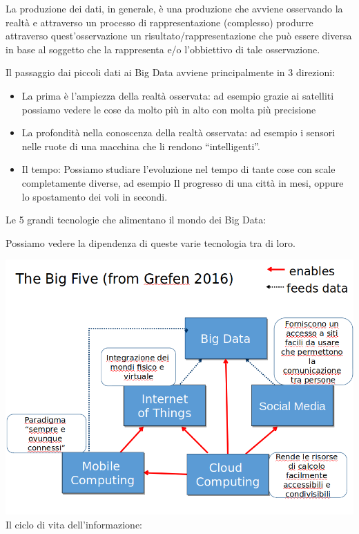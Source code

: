 \documentclass[a4page, 11pt]{article}
\begin{document}
La produzione dei dati, in generale, è una produzione che avviene
osservando la realtà e attraverso un processo di rappresentazione
(complesso) produrre attraverso quest'osservazione un
risultato/rappresentazione che può essere diversa in base al soggetto
che la rappresenta e/o l'obbiettivo di tale osservazione.

Il passaggio dai piccoli dati ai Big Data avviene principalmente in 3
direzioni:

\begin{itemize}
	 
	\item
	La prima è l'ampiezza della realtà osservata: ad esempio grazie ai
	satelliti possiamo vedere le cose da molto più in alto con molta più
	precisione
	\item
	La profondità nella conoscenza della realtà osservata: ad esempio i
	sensori nelle ruote di una macchina che li rendono ``intelligenti''.
	\item
	Il tempo: Possiamo studiare l'evoluzione nel tempo di tante cose con
	scale completamente diverse, ad esempio Il progresso di una città in
	mesi, oppure lo spostamento dei voli in secondi.
\end{itemize}

Le 5 grandi tecnologie che alimentano il mondo dei Big Data:

Possiamo vedere la dipendenza di queste varie tecnologia tra di loro.

\includegraphics[scale=0.4]{image7.png} \newline
Il ciclo di vita dell'informazione:
\end{document}
